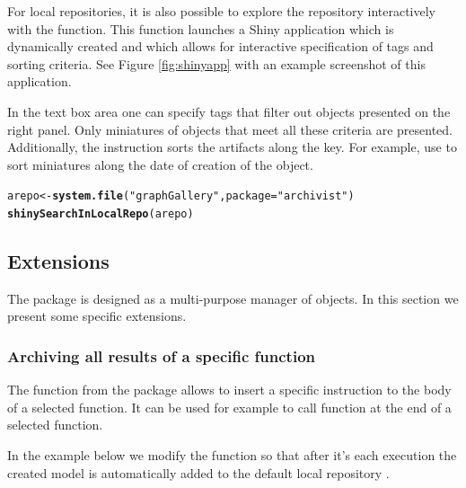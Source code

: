 \documentclass[nojss]{jss}\usepackage[]{graphicx}\usepackage[]{color}
\makeatletter
\newcommand{\hlstr}[1]{\textcolor[rgb]{0.192,0.494,0.8}{#1}}%
\newcommand{\hlstd}[1]{\textcolor[rgb]{0.345,0.345,0.345}{#1}}%
\newcommand{\hlkwb}[1]{\textcolor[rgb]{0.69,0.353,0.396}{#1}}%
\newcommand{\hlkwc}[1]{\textcolor[rgb]{0.333,0.667,0.333}{#1}}%
\newcommand{\hlkwd}[1]{\textcolor[rgb]{0.737,0.353,0.396}{\textbf{#1}}}%
\newenvironment{kframe}{%
 \def\at@end@of@kframe{}%
 \ifinner\ifhmode%
  \def\at@end@of@kframe{\end{minipage}}%
  \begin{minipage}{\columnwidth}%
 \fi\fi%
 \def\FrameCommand##1{\hskip\@totalleftmargin \hskip-\fboxsep
 \colorbox{shadecolor}{##1}\hskip-\fboxsep
     \hskip-\linewidth \hskip-\@totalleftmargin \hskip\columnwidth}%
 \MakeFramed {\advance\hsize-\width
   \@totalleftmargin\z@ \linewidth\hsize
   \@setminipage}}%
 {\par\unskip\endMakeFramed%
 \at@end@of@kframe}
\newenvironment{knitrout}{}{} %
\makeatother
\begin{document}
For local repositories, it is also possible to explore the repository interactively with the  function. This function launches a {Shiny} application \citep[see][]{shiny} which is dynamically created and which  allows for interactive specification of tags and sorting criteria. See Figure \ref{fig:shinyapp} with an example screenshot of this application.

In the text box area one can specify tags that filter out objects presented on the right panel. Only miniatures of objects that meet all these criteria are presented. Additionally, the instruction  sorts the artifacts along the key. For example, use  to sort miniatures along the date of creation of the object.


\begin{knitrout}
\color{fgcolor}\begin{kframe}
\begin{alltt}
\hlstd{arepo} \hlkwb{<-} \hlkwd{system.file}\hlstd{(}\hlstr{"graphGallery"}\hlstd{,} \hlkwc{package} \hlstd{=} \hlstr{"archivist"}\hlstd{)}
\hlkwd{shinySearchInLocalRepo}\hlstd{(arepo)}
\end{alltt}
\end{kframe}
\end{knitrout}

\clearpage

\subsection{Extensions}
\label{sec:extensions}

The  package is designed as a multi-purpose manager of objects. In this section we present some specific extensions.

\subsubsection{Archiving all results of a specific function}

The  function from the  package allows to insert a specific instruction to the body of a selected function. It can be used for example to call  function at the end of a selected function.

In the example below we modify the  function so that after it's each execution the created  model is automatically added to the default local repository .
\end{document}
